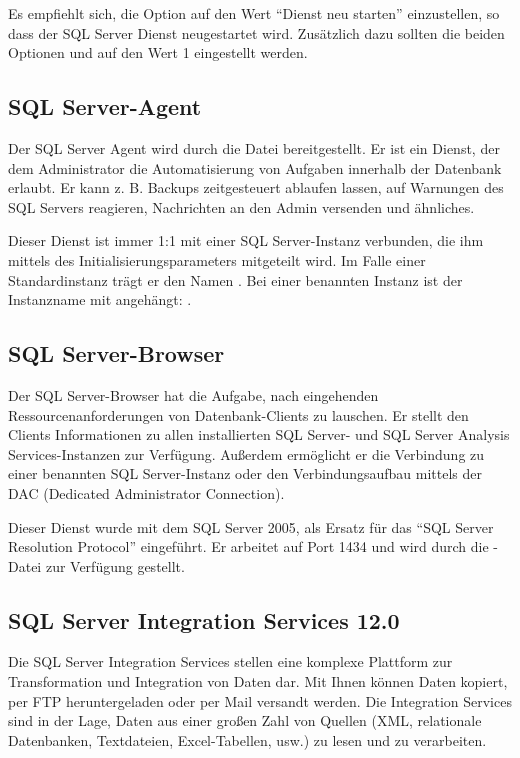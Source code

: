           Es empfiehlt sich, die Option  auf den
          Wert \enquote{Dienst neu starten} einzustellen, so dass der SQL Server
          Dienst neugestartet wird. Zusätzlich dazu sollten die beiden Optionen
           und
           auf den Wert 1
          eingestellt werden.
      \subsection{SQL Server-Agent}
        Der SQL Server Agent wird durch die Datei 
        bereitgestellt. Er ist ein Dienst, der dem Administrator die
        Automatisierung von Aufgaben innerhalb der Datenbank erlaubt. Er kann z.
        B. Backups zeitgesteuert ablaufen lassen, auf Warnungen des SQL Servers
        reagieren, Nachrichten an den Admin versenden und ähnliches.
        
        Dieser Dienst ist immer 1:1 mit einer SQL Server-Instanz verbunden,
        die ihm mittels des Initialisierungsparameters  mitgeteilt wird. Im Falle einer Standardinstanz
        trägt er den Namen .
        Bei einer benannten Instanz ist der Instanzname mit angehängt:
        .
      \subsection{SQL Server-Browser}
        Der SQL Server-Browser hat die Aufgabe, nach eingehenden
        Ressourcenanforderungen von Datenbank-Clients zu lauschen. Er stellt den
        Clients Informationen zu allen installierten SQL Server- und SQL
        Server Analysis Services-Instanzen zur Verfügung. Außerdem ermöglicht er
        die Verbindung zu einer benannten SQL Server-Instanz oder den
        Verbindungsaufbau mittels der DAC (Dedicated Administrator Connection).
  
        Dieser Dienst wurde mit dem SQL Server 2005, als Ersatz für das
        \enquote{SQL Server Resolution Protocol} eingeführt. Er arbeitet auf Port
        1434 und wird durch die -Datei
         zur Verfügung gestellt.
      \subsection{SQL Server Integration Services 12.0}
        Die SQL Server Integration Services stellen eine komplexe Plattform zur
        Transformation und Integration von Daten dar. Mit Ihnen können Daten
        kopiert, per FTP heruntergeladen oder per Mail versandt werden. Die
        Integration Services sind in der Lage, Daten aus einer großen Zahl von
        Quellen (XML, relationale Datenbanken, Textdateien, Excel-Tabellen,
        usw.) zu lesen und zu verarbeiten.
        
